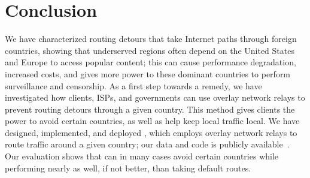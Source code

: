\section{Conclusion}
\label{conclusion}

We have characterized routing
detours that take Internet paths through foreign countries, showing 
that underserved regions often depend on the United States and Europe to 
access popular content; this can cause performance degradation, increased costs, 
and gives more power to these dominant countries to perform surveillance and censorship.  As a first step towards a remedy, we have
investigated how clients, ISPs, and governments can use overlay network relays to prevent routing detours through
a given country.  This method gives clients the power to
avoid certain countries, as well as help keep local traffic local.
We have
designed, implemented, and deployed \system{}, which employs overlay network
relays to  route traffic around a given country; our data and code is publicly available~\cite{ransom_data,ran_system}.  Our evaluation
shows  that \system{} can in many cases avoid certain countries while
performing nearly as well, if not better, than taking default routes.

